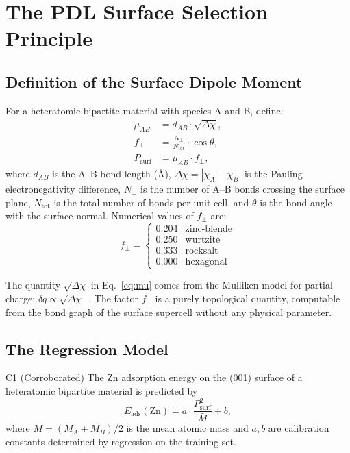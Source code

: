 \documentclass[11pt,a4paper]{article}
\newcommand{\Eads}{E_{\mathrm{ads}}}
\newcommand{\Psurf}{P_{\mathrm{surf}}}
\newcommand{\Mmoy}{\bar{M}}
\newcommand{\DeltaEN}{\Delta\chi}
\newcommand{\muAB}{\mu_{AB}}
\newcommand{\fracZ}{f_{\perp}}
\begin{document}
\section{The PDL Surface Selection Principle}
\label{sec:derivation}

\subsection{Definition of the Surface Dipole Moment}

For a heteratomic bipartite material with species A and B, define:
\begin{align}
\muAB &= d_{AB} \cdot \sqrt{\DeltaEN}, \label{eq:mu}\\
\fracZ &= \frac{N_{\perp}}{N_{\mathrm{tot}}} \cdot \cos\theta, \label{eq:fracZ}\\
\Psurf &= \muAB \cdot \fracZ, \label{eq:Psurf}
\end{align}
where $d_{AB}$ is the A--B bond length (\AA), $\DeltaEN = |\chi_A - \chi_B|$ is the Pauling electronegativity difference, $N_{\perp}$ is the number of A--B bonds crossing the surface plane, $N_{\mathrm{tot}}$ is the total number of bonds per unit cell, and $\theta$ is the bond angle with the surface normal. Numerical values of $\fracZ$ are:
\begin{equation}
\fracZ = \begin{cases} 0.204 & \text{zinc-blende} \\ 0.250 & \text{wurtzite} \\ 0.333 & \text{rocksalt} \\ 0.000 & \text{hexagonal} \end{cases}
\end{equation}

The quantity $\sqrt{\DeltaEN}$ in Eq.~\eqref{eq:mu} comes from the Mulliken model for partial charge: $\delta q \propto \sqrt{\DeltaEN}$~\cite{Mulliken1934}. The factor $\fracZ$ is a purely topological quantity, computable from the bond graph of the surface supercell without any physical parameter.

\subsection{The Regression Model}

\begin{conjecture}{C1 (Corroborated)}
The Zn adsorption energy on the (001) surface of a heteratomic bipartite material is predicted by
\begin{equation}
\Eads(\mathrm{Zn}) = a \cdot \frac{\Psurf^2}{\Mmoy} + b,
\label{eq:model}
\end{equation}
where $\Mmoy = (M_A + M_B)/2$ is the mean atomic mass and $a, b$ are calibration constants determined by regression on the training set.
\end{conjecture}
\end{document}
